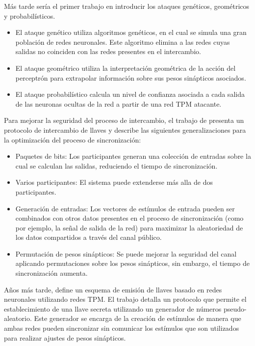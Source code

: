 Más tarde \cite{10.1007/3-540-36178-2_18} sería el primer trabajo en introducir los ataques genéticos, geométricos y probabilísticos.
\begin{itemize}
    \item El ataque genético utiliza algoritmos genéticos, en el cual se simula una gran población de redes neuronales. Este algoritmo elimina a las redes cuyas salidas no coinciden con las redes presentes en el intercambio.
    \item El ataque geométrico utiliza la interpretación geométrica de la acción del perceptrón para extrapolar información sobre sus pesos sinápticos asociados.
    \item El ataque probabilístico calcula un nivel de confianza asociada a cada salida de las neuronas ocultas de la red a partir de una red TPM atacante.
\end{itemize}

Para mejorar la seguridad del proceso de intercambio, el trabajo de \cite{doi:10.1142/9789812704634_0044} presenta un protocolo de intercambio de llaves y describe las siguientes generalizaciones para la optimización del proceso de sincronización:
\begin{itemize}
    \item Paquetes de bits: Los participantes generan una colección de entradas sobre la cual se calculan las salidas, reduciendo el tiempo de sincronización.
    \item Varios participantes: El sistema puede extenderse más alla de dos participantes.
    \item Generación de entradas: Los vectores de estímulos de entrada pueden ser combinados con otros datos presentes en el proceso de sincronización (como por ejemplo, la señal de salida de la red) para maximizar la aleatoriedad de los datos compartidos a través del canal público.
    \item Permutación de pesos sinápticos: Se puede mejorar la seguridad del canal aplicando permutaciones sobre los pesos sinápticos, sin embargo, el tiempo de sincronización aumenta.
\end{itemize}

Años más tarde, \cite{chen-2005} define un esquema de emisión de llaves basado en redes neuronales utilizando redes TPM. El trabajo detalla un protocolo que permite el establecimiento de una llave secreta utilizando un generador de números pseudo-aleatorio. Este generador se encarga de la creación de estímulos de manera que ambas redes pueden sincronizar sin comunicar los estímulos que son utilizados para realizar ajustes de pesos sinápticos.

